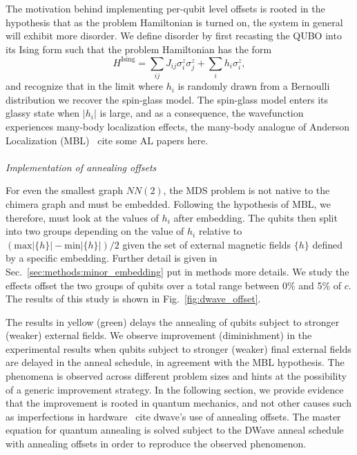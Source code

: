 \documentclass[prd,twocolumn,tightenlines,preprintnumbers,showpacs,superscriptaddress,notitlepage,nofootinbib,eqsecnum,
floatfix,longbibliography,aps,10pt]{revtex4-2}
\begin{document}
The motivation behind implementing per-qubit level offsets is rooted in the hypothesis that as the problem Hamiltonian is turned on, the system in general will exhibit more disorder. We define disorder by first recasting the QUBO into its Ising form such that the problem Hamiltonian has the form
\begin{equation}
H^{\textrm{Ising}} = \sum_{ij} J_{ij} \sigma^z_i \sigma^z_j + \sum_i h_i \sigma^z_i,
\end{equation}
and recognize that in the limit where $h_i$ is randomly drawn from a Bernoulli distribution we recover the spin-glass model. The spin-glass model enters its glassy state when $|h_i|$ is large, and as a consequence, the wavefunction experiences many-body localization effects, the many-body analogue of Anderson Localization (MBL)~{\color{red} cite some AL papers here}.
\\\\
\noindent\textit{Implementation of annealing offsets}
\label{sec:discussion:offsets}

For even the smallest graph $NN(2)$, the MDS problem is not native to the chimera graph and must be embedded. Following the hypothesis of MBL, we therefore, must look at the values of $h_i$ after embedding. The qubits then split into two groups depending on the value of $h_i$ relative to $(\textrm{max}|\{h\}| - \textrm{min}|\{h\}|) / 2$ given the set of external magnetic fields $\{h\}$ defined by a specific embedding. Further detail is given in Sec.~\ref{sec:methods:minor_embedding} {\color{red} put in methods more details}. We study the effects offset the two groups of qubits over a total range between 0\% and 5\% of $c$. The results of this study is shown in Fig.~\ref{fig:dwave_offset}.

The results in yellow (green) delays the annealing of qubits subject to stronger (weaker) external fields. We observe improvement (diminishment) in the experimental results when qubits subject to stronger (weaker) final external fields are delayed in the anneal schedule, in agreement with the MBL hypothesis. The phenomena is observed across different problem sizes and hints at the possibility of a generic improvement strategy. In the following section, we provide evidence that the improvement is rooted in quantum mechanics, and not other causes such as imperfections in hardware~\cite{} {\color{red} cite dwave's use of annealing offsets}. The master equation for quantum annealing is solved subject to the DWave anneal schedule with annealing offsets in order to reproduce the observed phenomenon.
\end{document}
